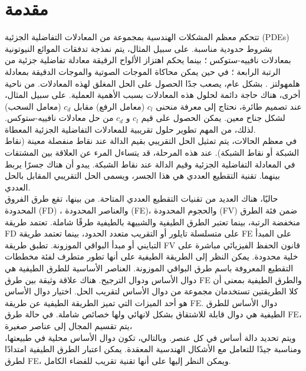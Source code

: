\chapter*{مقدمة }
\pagestyle{plain}
\noindent
تتحكم معظم المشكلات الهندسية بمجموعة من المعادلات التفاضلية الجزئية (PDEs) بشروط حدودية مناسبة. على سبيل المثال، يتم نمذجة تدفقات الموائع النيوتونية بمعادلات نافييه-ستوكس \cite{navier_stokes}؛ بينما يحكم اهتزاز الألواح الرقيقة معادلة تفاضلية جزئية من الرتبة الرابعة \cite{chang_shu}؛ في حين يمكن محاكاة الموجات الصوتية والموجات الدقيقة بمعادلة هلمهولتز \cite{chang_shu}. بشكل عام، يصعب جدًا الحصول على الحل المغلق لهذه المعادلات. من ناحية أخرى، هناك حاجة دائمة لحلول هذه المعادلات بسبب الأهمية العملية. على سبيل المثال، عند تصميم طائرة، نحتاج إلى معرفة منحنى \( c_l \) (معامل الرفع) مقابل \( c_d \) (معامل السحب) لشكل جناح معين. يمكن الحصول على قيم \( c_l \) و \( c_d \) من حل معادلات نافييه-ستوكس. لذلك، من المهم تطوير حلول تقريبية للمعادلات التفاضلية الجزئية المعطاة.\\
\noindent
في معظم الحالات، يتم تمثيل الحل التقريبي بقيم الدالة عند نقاط منفصلة معينة (نقاط الشبكة أو نقاط الشبكة). عند هذه المرحلة، قد يتساءل المرء عن العلاقة بين المشتقات في المعادلة التفاضلية الجزئية وقيم الدالة عند نقاط الشبكة. يبدو أن هناك جسرًا يربط بينهما. تقنية التقطيع العددي هي هذا الجسر، ويسمى الحل التقريبي المقابل بالحل العددي.\\
\noindent
حاليًا، هناك العديد من تقنيات التقطيع العددي المتاحة. من بينها، تقع طرق الفروق المحدودة (FD) \cite{navier_stokes}، والعناصر المحدودة (FE)، والحجوم المحدودة (FV) \cite{finite_difference} ضمن فئة الطرق منخفضة الرتبة، بينما تعتبر الطرق الطيفية والشبيهة بالطيفية طرقًا شاملة. تعتمد طريقة FD على متسلسلة تايلور أو التقريب متعدد الحدود، بينما تعتمد طريقة FE على المبدأ التبايني أو مبدأ البواقي الموزونة. تطبق طريقة FV قانون الحفظ الفيزيائي مباشرة على خلية محدودة. يمكن النظر إلى الطريقة الطيفية على أنها تطور متطرف لفئة مخططات التقطيع المعروفة باسم طرق البواقي الموزونة. العناصر الأساسية للطرق الطيفية هي دوال الأساس ودوال الترجيح. هناك علاقة وثيقة بين طرق FE والطرق الطيفية بمعنى أن كلا الطريقتين تستخدمان مجموعة من دوال الأساس لتقريب الحل. اختيار دوال الأساس هو أحد الميزات التي تميز الطريقة الطيفية عن طريقة FE. دوال الأساس للطرق الطيفية هي دوال قابلة للاشتقاق بشكل لانهائي ولها خصائص شاملة. في حالة طرق FE، يتم تقسيم المجال إلى عناصر صغيرة،\\
\noindent
ويتم تحديد دالة أساس في كل عنصر. وبالتالي، تكون دوال الأساس محلية في طبيعتها، ومناسبة جيدًا للتعامل مع الأشكال الهندسية المعقدة. يمكن اعتبار الطرق الطيفية امتدادًا لطرق FE، ويمكن النظر إليها على أنها تقنية تقريب للفضاء الكامل.\\
